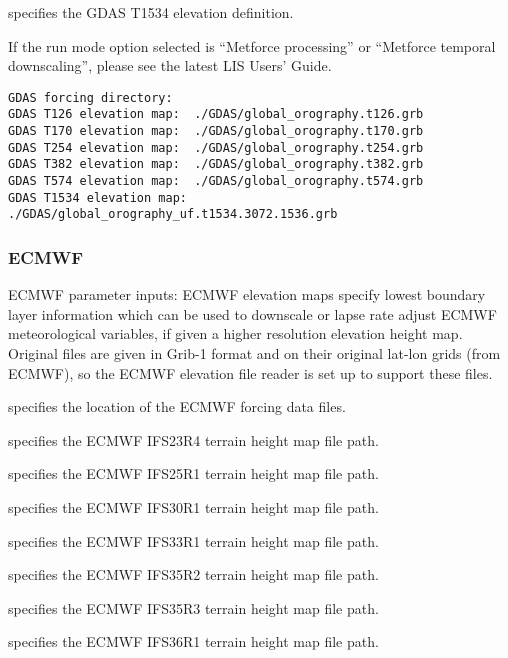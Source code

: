   specifies the GDAS T1534 elevation
 definition.

 If the run mode option selected is ``Metforce processing'' or
 ``Metforce temporal downscaling'', please see the latest LIS Users'
 Guide.

 

 \begin{Verbatim}[frame=single]
GDAS forcing directory:
GDAS T126 elevation map:  ./GDAS/global_orography.t126.grb
GDAS T170 elevation map:  ./GDAS/global_orography.t170.grb
GDAS T254 elevation map:  ./GDAS/global_orography.t254.grb
GDAS T382 elevation map:  ./GDAS/global_orography.t382.grb
GDAS T574 elevation map:  ./GDAS/global_orography.t574.grb
GDAS T1534 elevation map: ./GDAS/global_orography_uf.t1534.3072.1536.grb
 \end{Verbatim}

 
 \subsubsection{ECMWF} \label{sssec:forcings_ecmwf}
 ECMWF parameter inputs:  ECMWF elevation maps specify lowest
 boundary layer information which can be used to downscale or
 lapse rate adjust ECMWF meteorological variables, if given a higher 
 resolution elevation height map. Original files are given in
 Grib-1 format and on their original lat-lon grids (from ECMWF), 
 so the ECMWF elevation file reader is set up to support these files.

  specifies the location of the
 ECMWF forcing data files.

  specifies the ECMWF IFS23R4 
 terrain height map file path.

  specifies the ECMWF IFS25R1
 terrain height map file path.

  specifies the ECMWF IFS30R1 
 terrain height map file path.

  specifies the ECMWF IFS33R1 
 terrain height map file path.

  specifies the ECMWF IFS35R2
 terrain height map file path.

  specifies the ECMWF IFS35R3
 terrain height map file path.

  specifies the ECMWF IFS36R1
 terrain height map file path.

